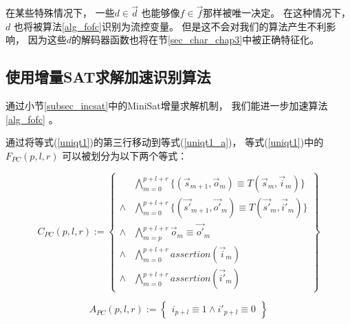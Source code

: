 在某些特殊情况下，
一些$d\in \vec{d}$ 也能够像$f\in \vec{f}$那样被唯一决定。
在这种情况下，
$d$ 也将被算法\ref{alg_fofc}识别为流控变量。
但是这不会对我们的算法产生不利影响，
因为这些$d$的解码器函数也将在节\ref{sec_char_chap3}中被正确特征化。


\subsection{使用增量SAT求解加速识别算法}\label{incSAT}

通过小节\ref{subsec_incsat}中的MiniSat增量求解机制，
我们能进一步加速算法\ref{alg_fofc} 。

通过将等式(\ref{uniqt1})的第三行移动到等式(\ref{uniqt1_a})，
等式(\ref{uniqt1})中的$F_{PC}(p,l,r)$  可以被划分为以下两个等式：

\begin{equation}\label{uniqt1_f}
C_{PC}(p,l,r):=
\left\{
\begin{array}{cc}
&\bigwedge_{m=0}^{p+l+r}
\{
(\vec{s}_{m+1},\vec{o}_m)\equiv T(\vec{s}_m,\vec{i}_m)
\}
\\
\wedge&\bigwedge_{m=0}^{p+l+r}
\{
(\vec{s'}_{m+1},\vec{o'}_m)\equiv T(\vec{s'}_m,\vec{i'}_m)
\}
\\
\wedge&\bigwedge_{m=p}^{p+l+r}\vec{o}_m\equiv \vec{o'}_m \\
\wedge&\bigwedge_{m=0}^{p+l+r}assertion(\vec{i}_m) \\
\wedge&\bigwedge_{m=0}^{p+l+r}assertion(\vec{i'}_m)
\end{array}
\right\}
\end{equation}

\begin{equation}\label{uniqt1_a}
A_{PC}(p,l,r):=
\left\{
\begin{array}{c}
 i_{p+l}\equiv 1 \wedge  i'_{p+l}\equiv 0
\end{array}
\right\}
\end{equation}

